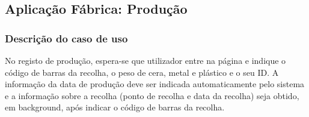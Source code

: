 \subsection{Aplicação Fábrica: Produção}
\subsubsection*{Descrição do caso de uso}
No registo de produção, espera-se que utilizador entre na página e indique o código de barras da recolha, o peso de cera, metal e plástico e o seu ID. A informação da data de produção deve ser indicada automaticamente pelo sistema e a informação sobre a recolha (ponto de recolha e data da recolha) seja obtido, em background, após indicar o código de barras da recolha.


